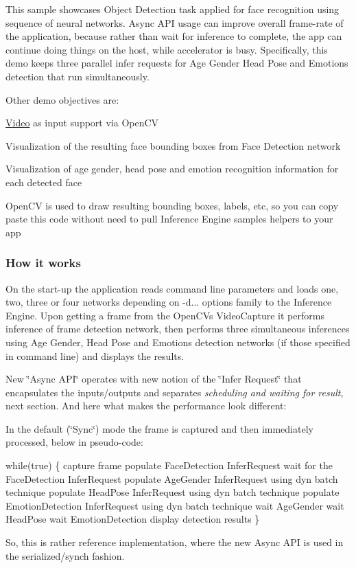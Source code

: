 This sample showcases Object Detection task applied for face recognition using sequence of neural networks. Async A\+PI usage can improve overall frame-\/rate of the application, because rather than wait for inference to complete, the app can continue doing things on the host, while accelerator is busy. Specifically, this demo keeps three parallel infer requests for Age Gender Head Pose and Emotions detection that run simultaneously.

Other demo objectives are\+:
\begin{DoxyItemize}
\item \hyperlink{classVideo}{Video} as input support via Open\+CV
\item Visualization of the resulting face bounding boxes from Face Detection network
\item Visualization of age gender, head pose and emotion recognition information for each detected face
\item Open\+CV is used to draw resulting bounding boxes, labels, etc, so you can copy paste this code without need to pull Inference Engine samples helpers to your app
\end{DoxyItemize}

\subsubsection*{How it works}

On the start-\/up the application reads command line parameters and loads one, two, three or four networks depending on -\/d... options family to the Inference Engine. Upon getting a frame from the Open\+CV\textquotesingle{}s Video\+Capture it performs inference of frame detection network, then performs three simultaneous inferences using Age Gender, Head Pose and Emotions detection networks (if those specified in command line) and displays the results.

New \char`\"{}\+Async A\+P\+I\char`\"{} operates with new notion of the \char`\"{}\+Infer Request\char`\"{} that encapsulates the inputs/outputs and separates {\itshape scheduling and waiting for result}, next section. And here what makes the performance look different\+:
\begin{DoxyEnumerate}
\item In the default (\char`\"{}\+Sync\char`\"{}) mode the frame is captured and then immediately processed, below in pseudo-\/code\+: 
\begin{DoxyCode}
\textcolor{keywordflow}{while}(\textcolor{keyword}{true}) \{
    capture frame
    populate FaceDetection InferRequest
    wait \textcolor{keywordflow}{for} the FaceDetection InferRequest
    populate AgeGender InferRequest \textcolor{keyword}{using} dyn batch technique
    populate HeadPose InferRequest \textcolor{keyword}{using} dyn batch technique
    populate EmotionDetection InferRequest \textcolor{keyword}{using} dyn batch technique
    wait AgeGender
    wait HeadPose
    wait EmotionDetection
    display detection results
\}
\end{DoxyCode}
 So, this is rather reference implementation, where the new Async A\+PI is used in the serialized/synch fashion.
\end{DoxyEnumerate}


